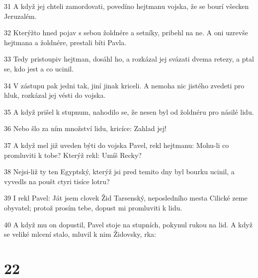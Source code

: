 \par 31 A když jej chteli zamordovati, povedíno hejtmanu vojska, že se bourí všecken Jeruzalém.
\par 32 Kterýžto hned pojav s sebou žoldnére a setníky, pribehl na ne. A oni uzrevše hejtmana a žoldnére, prestali bíti Pavla.
\par 33 Tedy pristoupiv hejtman, dosáhl ho, a rozkázal jej svázati dvema retezy, a ptal se, kdo jest a co ucinil.
\par 34 V zástupu pak jedni tak, jiní jinak kriceli. A nemoha nic jistého zvedeti pro hluk, rozkázal jej vésti do vojska.
\par 35 A když prišel k stupnum, nahodilo se, že nesen byl od žoldnéru pro násilé lidu.
\par 36 Nebo šlo za ním množství lidu, kricíce: Zahlad jej!
\par 37 A když mel již uveden býti do vojska Pavel, rekl hejtmanu: Mohu-li co promluviti k tobe? Kterýž rekl: Umíš Recky?
\par 38 Nejsi-liž ty ten Egyptský, kterýž jsi pred temito dny byl bourku ucinil, a vyvedls na poušt ctyri tisíce lotru?
\par 39 I rekl Pavel: Ját jsem clovek Žid Tarsenský, neposledního mesta Cilické zeme obyvatel; protož prosím tebe, dopust mi promluviti k lidu.
\par 40 A když mu on dopustil, Pavel stoje na stupních, pokynul rukou na lid. A když se veliké mlcení stalo, mluvil k nim Židovsky, rka:

\chapter{22}

